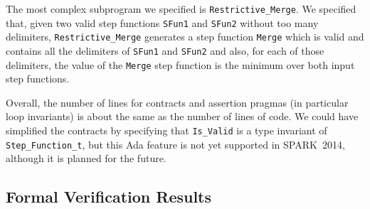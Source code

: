 \documentclass[10pt,a4paper,twocolumn]{article}
\newcommand{\newspark}{SPARK~2014\xspace}
\begin{document}
The most complex subprogram we specified is \verb|Restrictive_Merge|.
We specified that, given two valid step functions \verb|SFun1| and
\verb|SFun2| without too many delimiters, \verb|Restrictive_Merge|
generates a step function \verb|Merge| which is valid and contains all
the delimiters of \verb|SFun1| and \verb|SFun2| and also, for each of
those delimiters, the value of the \verb|Merge| step function is the
minimum over both input step functions.



Overall, the number of lines for contracts and assertion pragmas (in
particular loop invariants) is about the same as the number of lines
of code. We could have simplified the contracts by specifying that
\verb|Is_Valid| is a type invariant of \verb|Step_Function_t|, but
this Ada feature is not yet supported in \newspark, although it is
planned for the future.

\subsection{Formal Verification Results}
\end{document}
